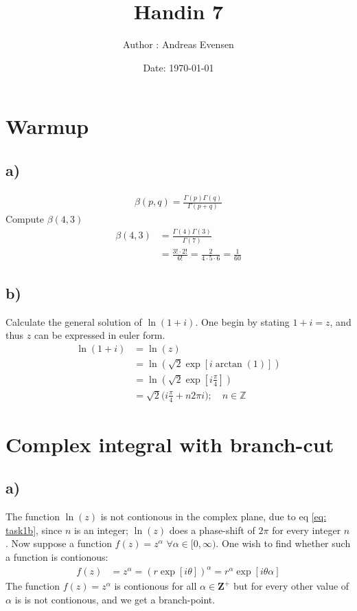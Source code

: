 \documentclass{article}
\title{Handin 7}
\author{Author : Andreas Evensen}
\date{Date: \today}
\begin{document}
\maketitle

\section*{Warmup}

\subsection*{a)}
\begin{align*}
    \beta(p, q) = \frac{\Gamma(p)\Gamma(q)}{\Gamma(p+q)}
\end{align*}
Compute $\beta(4,3)$
\begin{align*}
    \beta(4, 3) &= \frac{\Gamma(4)\Gamma(3)}{\Gamma(7)}\\
    &=\frac{3!\cdot2!}{6!} = \frac{2}{4\cdot 5 \cdot 6} = \frac{1}{60}
\end{align*}
\subsection*{b)}
Calculate the general solution of $\ln(1+i)$. One begin by stating $1 + i = z$, and thus $z$ can be expressed in euler form.
\begin{align}
    \ln(1 + i) &=\ln(z)\nonumber\\
    &=\ln\left(\sqrt{2}\exp\left[i\arctan(1)\right]\right)\nonumber\\
    &=\ln\left(\sqrt{2}\exp\left[i\frac{\pi}{4}\right]\right)\nonumber\\
    &= \sqrt{2}\Big(i\frac{\pi}{4} + n2\pi i\Big) ; \quad n \in\mathbb{Z}\label{eq: task1b}
\end{align}

\section*{Complex integral with branch-cut}

\subsection*{a)}
The function $\ln(z)$ is not contionous in the complex plane, due to eq \eqref{eq: task1b}, since $n$ is an integer; $\ln(z)$ does a phase-shift of $2\pi$ for every integer $n$.
Now suppose a function $f(z) = z^\alpha$ $\forall \alpha \in[0, \infty)$. One wish to find whether such a function is contionous:
\begin{align*}
    f(z) &= z^\alpha = \left(r\exp[i\theta]\right)^\alpha = r^\alpha\exp[i\theta\alpha]
\end{align*}The function $f(z) = z^\alpha$ is contionous for all $\alpha \in \mathbf{Z}^+$ but for every other value of $\alpha$ is is not contionous, and we get a branch-point.
\end{document}

